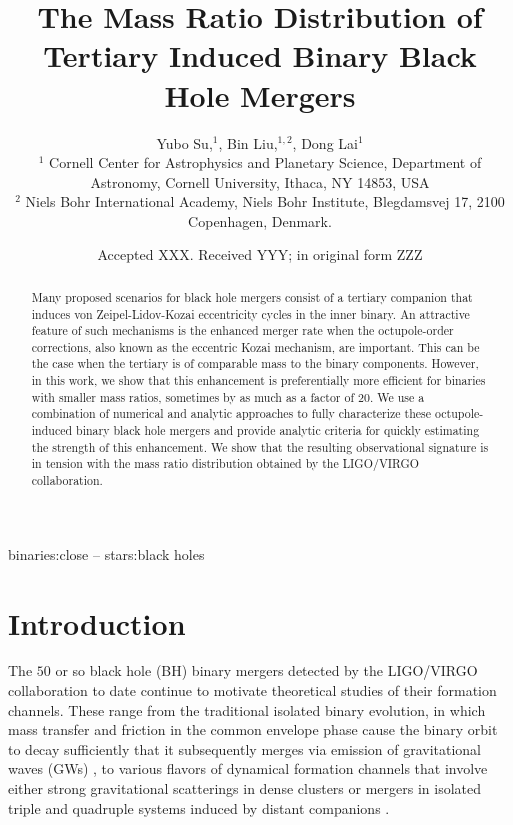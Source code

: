 \documentclass[
        fleqn,
        usenatbib,
    ]{mnras}
\title[Mass Ratio Distribution]{The Mass Ratio Distribution of
Tertiary Induced Binary Black Hole Mergers}
\author[Y. Su et\ al.]{
Yubo Su,$^1$,
Bin Liu,$^{1,2}$,
Dong Lai$^1$
\\
$^1$ Cornell Center for Astrophysics and Planetary Science, Department of
Astronomy, Cornell University, Ithaca, NY 14853, USA\\
$^2$ Niels Bohr International Academy, Niels Bohr Institute, Blegdamsvej 17,
2100 Copenhagen, Denmark.
}
\date{Accepted XXX\@. Received YYY\@; in original form ZZZ}
\begin{document}
\label{firstpage}
\pagerange{\pageref{firstpage}--\pageref{lastpage}}
\maketitle

\begin{abstract}
    Many proposed scenarios for black hole mergers consist of a tertiary
    companion that induces von Zeipel-Lidov-Kozai eccentricity cycles in the
    inner binary. An attractive feature of such mechanisms is the enhanced
    merger rate when the octupole-order corrections, also known as the eccentric
    Kozai mechanism, are important. This can be the case when the tertiary is of
    comparable mass to the binary components. However, in this work, we show
    that this enhancement is preferentially more efficient for binaries with
    smaller mass ratios, sometimes by as much as a factor of $20$. We use a
    combination of numerical and analytic approaches to fully characterize these
    octupole-induced binary black hole mergers and provide analytic criteria for
    quickly estimating the strength of this enhancement. We show that the
    resulting observational signature is in tension with the mass ratio
    distribution obtained by the LIGO/VIRGO collaboration.
\end{abstract}

\begin{keywords}
binaries:close -- stars:black holes %
\end{keywords}

\section{Introduction}\label{s:intro}

The $50$ or so black hole (BH) binary mergers detected by the LIGO/VIRGO
collaboration to date \citep{LIGOO3a} continue to motivate theoretical studies of their
formation channels. These range from the traditional isolated binary evolution,
in which mass transfer and friction in the common envelope phase cause the
binary orbit to decay sufficiently that it subsequently merges via emission of
gravitational waves (GWs) \citep[e.g.,][]{lipunov1997black,
lipunov2017first, podsiadlowski2003formation, belczynski2010effect,
belczynski2016first, dominik2012double, dominik2013double, dominik2015double},
to various flavors of dynamical formation channels that involve either strong
gravitational scatterings in dense clusters \citep[e.g.,][]{zwart1999black,
o2006binary, miller2009mergers, banerjee2010stellar, downing2010compact,
ziosi2014dynamics, rodriguez2015binary, samsing2017assembly, samsing2018black,
rodriguez2018post, gondan2018eccentric} or mergers in isolated triple and
quadruple systems induced by distant companions \citep[e.g.,][]{miller2002four,
wen2003eccentricity, antonini2012secular, antonini2017binary, silsbee2017lidov,
LL17, LL18, randall2018induced, hoang2018black, fragione2019, fragione2019loeb,
LL19, bin_misc5, bin_misc1, bin_misc2}.
\end{document}
